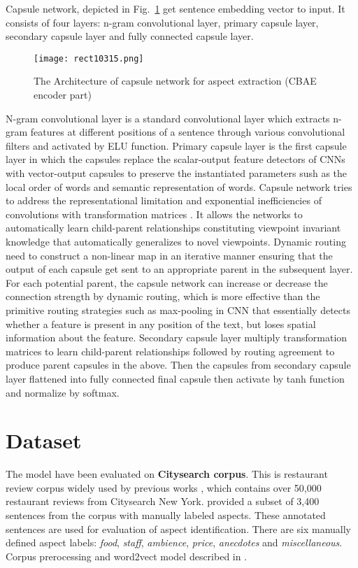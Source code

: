 \documentclass{article}
\begin{document}
Capsule network, depicted in Fig.~\ref{fig:capsule} get sentence embedding vector to input. It consists of four layers: n-gram convolutional layer, primary capsule layer, secondary capsule layer and fully connected capsule layer. 

\begin{figure}[!tbh]
    \centering
    \texttt{[image: rect10315.png]}
    \caption{The Architecture of capsule network for aspect extraction (CBAE encoder part)}
    \label{fig:capsule}
\end{figure}

N-gram convolutional layer is a standard convolutional layer which extracts n-gram features at different positions of a sentence through various convolutional filters\cite{Zhao2018} and activated by ELU function. Primary capsule layer is the first capsule layer in which the capsules replace the scalar-output feature detectors of CNNs with vector-output capsules to preserve the instantiated parameters sush as the local order of words and semantic representation of words. Capsule network tries to address the representational limitation and exponential inefficiencies of convolutions with transformation matrices \cite{Hinton2017DRBC}. It allows the networks to automatically learn child-parent relationships constituting viewpoint invariant knowledge that automatically generalizes to novel viewpoints. Dynamic routing need to construct a non-linear map in an iterative manner ensuring that the output of each capsule get sent to an appropriate parent in the subsequent layer. For each potential parent, the capsule network can increase or decrease the connection strength by dynamic routing, which is more effective than the primitive routing strategies such as max-pooling in CNN that essentially detects whether a feature is present in any position of the text, but loses spatial information about the feature. Secondary capsule layer multiply transformation matrices to learn child-parent relationships followed by routing agreement to produce parent capsules in the above. Then the capsules from secondary capsule layer flattened into fully connected final capsule then activate by tanh function and normalize by softmax.


\section{Dataset}
The model have been evaluated on \textbf{Citysearch corpus}. This is restaurant review corpus widely used by previous works \cite{Ganu2009BeyondTheStars} \cite{Brody2010UAS} \cite{Zhao2010JMA}, which contains over 50,000 restaurant reviews from Citysearch New York. \cite{Ganu2009BeyondTheStars} provided a subset of 3,400 sentences from the corpus with manually labeled aspects. These annotated sentences are used for evaluation of aspect identification. There are six manually defined aspect labels: \textit{food}, \textit{staff}, \textit{ambience}, \textit{price}, \textit{anecdotes} and \textit{miscellaneous}. Corpus prerocessing and word2vect model described in \cite{He2018ABAE}.
\end{document}
